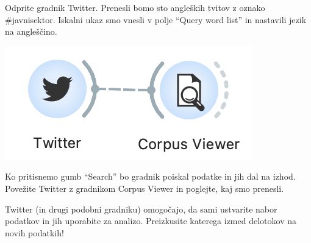 Odprite gradnik Twitter. Prenesli bomo sto angleških tvitov z oznako \#javnisektor. Iskalni ukaz smo vnesli v polje ``Query word list'' in nastavili jezik na angleščino.

\begin{marginfigure}[0cm]
    \includegraphics[width=\linewidth]{twitter-workflow.png}
    \caption{}
\end{marginfigure}

Ko pritisnemo gumb “Search” bo gradnik poiskal podatke in jih dal na izhod. Povežite Twitter z gradnikom Corpus Viewer in poglejte, kaj smo prenesli.

Twitter (in drugi podobni gradniku) omogočajo, da sami ustvarite nabor podatkov in jih uporabite za analizo. Preizkusite katerega izmed delotokov na novih podatkih!